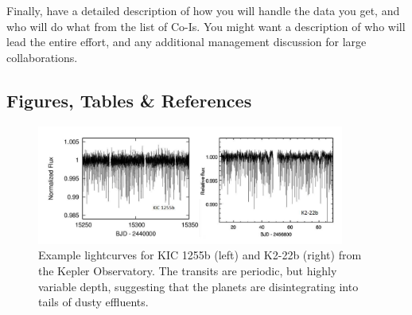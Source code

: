 \documentclass[letterpaper,12pt]{article}
\begin{document}
Finally, have a detailed description of how you will handle the
data you get, and who will do what from the list of Co-Is.  You
might want a description of who will lead the entire effort, and
any additional management discussion for large collaborations. 

\clearpage
\subsection{Figures, Tables \& References}

\begin{figure}
\centering
\includegraphics[width=0.9\textwidth]{kepler_lightc_variable.png}
\caption{Example lightcurves for KIC 1255b (left) and K2-22b (right) from the Kepler Observatory. The transits are periodic, but highly variable depth, suggesting that the planets are disintegrating into tails of dusty effluents.}\label{fig:exKeplerCurves}
\end{figure}






\end{document}
